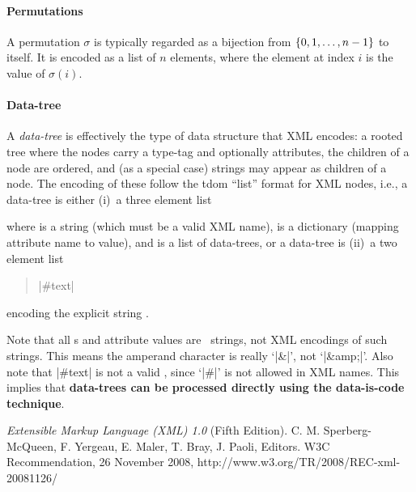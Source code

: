 \documentclass{mtmtcl}
\theoremstyle{plain}
\theoremstyle{remark}
\begin{document}
\paragraph{Permutations}
A permutation $\sigma$ is typically regarded as a bijection from 
$\{0,1,\dotsc, n-\nobreak1\}$ to itself. It is encoded as a list of 
$n$ elements, where the element at index $i$ is the value of 
$\sigma(i)$.

\paragraph{Data-tree}
A \emph{data-tree} is effectively the type of data structure that 
XML encodes: a rooted tree where the nodes carry a type-tag and 
optionally attributes, the children of a node are ordered, and (as a 
special case) strings may appear as children of a node. The encoding 
of these follow the \textsf{tdom} ``list'' format for XML nodes, 
i.e., a data-tree is either (i)~a three element list
\begin{quote}
    
\end{quote}
where  is a string (which must be a valid XML name), 
 is a dictionary (mapping attribute name to value), 
and  is a list of data-trees, or a data-tree is (ii)~a 
two element list
\begin{quote}
  |#text| 
\end{quote}
encoding the explicit string .

Note that all s and attribute values are \Tcl\ strings, 
not XML encodings of such strings. This means the amperand character 
is really `|&|', not `|&amp;|'. Also note that |#text| is not a valid 
, since `|#|' is not allowed in XML names. This implies 
that \textbf{data-trees can be processed directly using the 
data-is-code technique}.




\begin{thebibliography}{99}

  \textit{Extensible Markup Language (XML) 1.0} (Fifth Edition).
  C. M. Sperberg-McQueen, F. Yergeau, E. Maler, T. Bray, J. Paoli, 
  Editors.
  W3C Recommendation, 26 November 2008, 
  http://www.w3.org/TR/2008/REC-xml-20081126/ 

\end{thebibliography}

\PrintIndex
\end{document}
